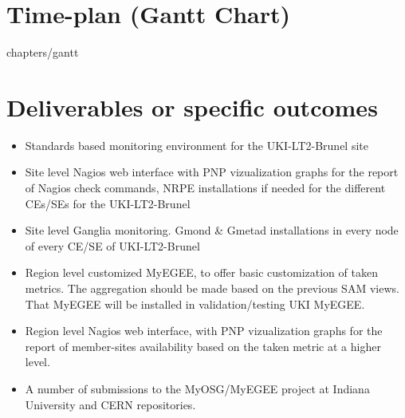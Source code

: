 \section[Time plan]{Time-plan (Gantt Chart)}

 {chapters/gantt}
\pagebreak
\section[Deliverables]{Deliverables or specific outcomes}

\begin{itemize}
  \item Standards based monitoring environment for the UKI-LT2-Brunel site
  \item Site level Nagios web interface with PNP vizualization graphs for the report of Nagios check commands, NRPE installations if needed for the different CEs/SEs for the UKI-LT2-Brunel
  \item Site level Ganglia monitoring. Gmond \& Gmetad installations in every node of every CE/SE of UKI-LT2-Brunel
  \item Region level customized MyEGEE, to offer basic customization of taken metrics. The aggregation should be made based on the previous SAM views. That MyEGEE will be installed in validation/testing UKI MyEGEE.
  \item Region level Nagios web interface, with PNP vizualization graphs for the report of member-sites availability based on the taken metric at a higher level.
  \item A number of submissions to the MyOSG/MyEGEE project at Indiana University and CERN repositories.
\end{itemize}
